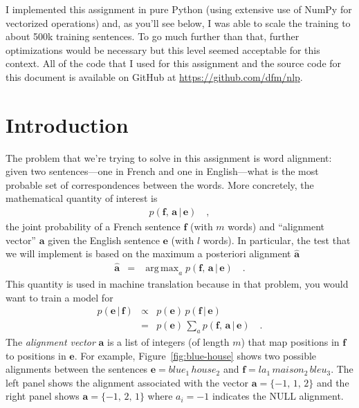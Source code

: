 \documentclass[11pt]{article}
\newcommand{\eqlabel}[1]{\label{eq:#1}}
\newcommand{\fig}[1]{Figure~\ref{fig:#1}}
\newcommand{\bvec}[1]{\ensuremath{\boldsymbol{#1}}}
\newcommand{\code}[1]{{\sffamily #1}}
\DeclareMathOperator*{\argmax}{arg\,max}
\begin{document}
I implemented this assignment in pure Python (using extensive use of NumPy for
vectorized operations) and, as you'll see below, I was able to scale the
training to about 500k training sentences.
To go much further than that, further optimizations would be necessary but
this level seemed acceptable for this context.
All of the code that I used for this assignment and the source code for this
document is available on GitHub at \url{https://github.com/dfm/nlp}.

\section{Introduction}

The problem that we're trying to solve in this assignment is word alignment:
given two sentences---one in French and one in English---what is the most
probable set of correspondences between the words.
More concretely, the mathematical quantity of interest is
\begin{eqnarray}\eqlabel{prob}
    p (\bvec{f},\,\bvec{a}\,|\,\bvec{e})\quad,
\end{eqnarray}
the joint probability of a French sentence $\bvec{f}$ (with $m$ words) and
``alignment vector'' $\bvec{a}$ given the English sentence $\bvec{e}$ (with
$l$ words).
In particular, the test that we will implement is based on the maximum
a posteriori alignment $\hat{\bvec{a}}$
\begin{eqnarray}
\hat{\bvec{a}} &=& \argmax_a p (\bvec{f},\,\bvec{a}\,|\,\bvec{e}) \quad.
\end{eqnarray}
This quantity is used in machine translation because in that problem, you
would want to train a model for
\begin{eqnarray}
p(\bvec{e}\,|\,\bvec{f}) &\propto&
    p(\bvec{e})\,p(\bvec{f}\,|\,\bvec{e}) \nonumber\\
    &=& p(\bvec{e})\,
        \sum_a p (\bvec{f},\,\bvec{a}\,|\,\bvec{e}) \quad.
\end{eqnarray}
The \emph{alignment vector} $\bvec{a}$ is a list of integers (of length $m$)
that map positions in $\bvec{f}$ to positions in $\bvec{e}$.
For example, \fig{blue-house} shows two possible alignments between the
sentences $\bvec{e} = blue_1\,house_2$ and
$\bvec{f} = la_1\,maison_2\,bleu_3$.
The left panel shows the alignment associated with the vector
$\bvec{a} = \{-1,\,1,\,2\}$ and the right panel shows $\bvec{a} =
\{-1,\,2,\,1\}$ where $a_i=-1$ indicates the \code{NULL} alignment.
\end{document}
